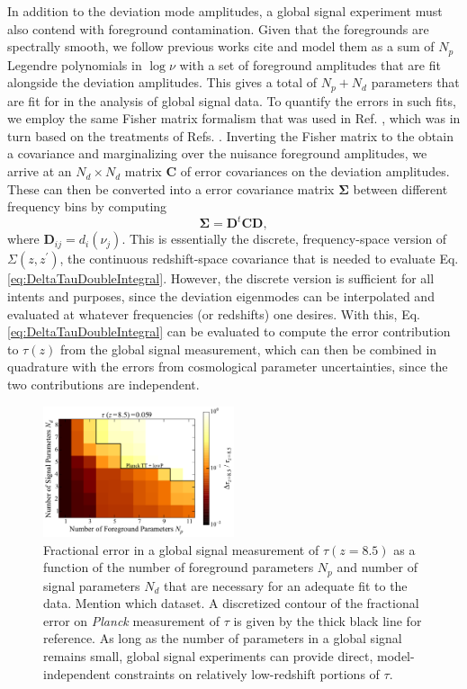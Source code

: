 \documentclass[twocolumn,aps,prd,nofootinbib,showpacs]{revtex4-1}
\begin{document}
In addition to the deviation mode amplitudes, a global signal experiment must also contend with foreground contamination. Given that the foregrounds are spectrally smooth, we follow previous works \acl{cite} and model them as a sum of $N_p$ Legendre polynomials in $\log \nu$ with a set of foreground amplitudes that are fit alongside the deviation amplitudes. This gives a total of $N_p + N_d$ parameters that are fit for in the analysis of global signal data. To quantify the errors in such fits, we employ the same Fisher matrix formalism that was used in Ref. \cite{presley_et_al2015}, which was in turn based on the treatments of Refs. \cite{pritchard_et_al2010,bernardi_et_al2015}. Inverting the Fisher matrix to the obtain a covariance and marginalizing over the nuisance foreground amplitudes, we arrive at an $N_d \times N_d$ matrix $\mathbf{C}$ of error covariances on the deviation amplitudes. These can then be converted into a error covariance matrix $\boldsymbol \Sigma$ between different frequency bins by computing
\begin{equation}
\boldsymbol \Sigma = \mathbf{D}^t \mathbf{C} \mathbf{D},
\end{equation}
where $\mathbf{D}_{ij} = d_i (\nu_j) $. This is essentially the discrete, frequency-space version of $\Sigma ( z, z^\prime)$, the continuous redshift-space covariance that is needed to evaluate Eq. \eqref{eq:DeltaTauDoubleIntegral}. However, the discrete version is sufficient for all intents and purposes, since the deviation eigenmodes can be interpolated and evaluated at whatever frequencies (or redshifts) one desires. With this, Eq. \eqref{eq:DeltaTauDoubleIntegral} can be evaluated to compute the error contribution to $\tau(z)$ from the global signal measurement, which can then be combined in quadrature with the errors from cosmological parameter uncertainties, since the two contributions are independent.

\begin{figure}[!]
\centering
\includegraphics[width=0.5\textwidth]{figures/PlanckTTlowP_globalSigErrors.pdf}
\caption{Fractional error in a global signal measurement of $\tau(z=8.5)$ as a function of the number of foreground parameters $N_p$ and number of signal parameters $N_d$ that are necessary for an adequate fit to the data. \acl{Mention which dataset}. A discretized contour of the fractional error on \emph{Planck} measurement of $\tau$ is given by the thick black line for reference. As long as the number of parameters in a global signal remains small, global signal experiments can provide direct, model-independent constraints on relatively low-redshift portions of $\tau$.}
\label{fig:PlanckTTlowP_globalSigErrors}
\end{figure}
\end{document}
